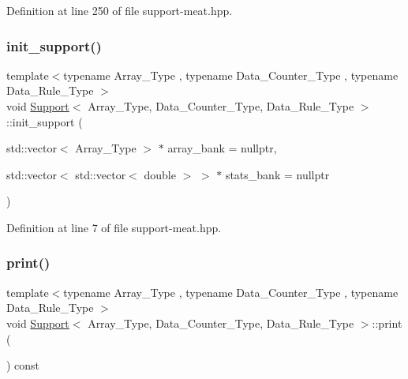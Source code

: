 Definition at line 250 of file support-\/meat.\+hpp.

\mbox{\label{class_support_a013872a55ffd6a0a931e124da8e8dc99}} 
\subsubsection{\texorpdfstring{init\+\_\+support()}{init\_support()}}
{\footnotesize\ttfamily template$<$typename Array\+\_\+\+Type , typename Data\+\_\+\+Counter\+\_\+\+Type , typename Data\+\_\+\+Rule\+\_\+\+Type $>$ \\
void \hyperlink{class_support}{Support}$<$ Array\+\_\+\+Type, Data\+\_\+\+Counter\+\_\+\+Type, Data\+\_\+\+Rule\+\_\+\+Type $>$\+::init\+\_\+support (\begin{DoxyParamCaption}\item[{std\+::vector$<$ Array\+\_\+\+Type $>$ $\ast$}]{array\+\_\+bank = {\ttfamily nullptr},  }\item[{std\+::vector$<$ std\+::vector$<$ double $>$ $>$ $\ast$}]{stats\+\_\+bank = {\ttfamily nullptr} }\end{DoxyParamCaption})\hspace{0.3cm}{\ttfamily [inline]}}



Definition at line 7 of file support-\/meat.\+hpp.

\mbox{\label{class_support_af87b2e85ec72e394387946023508e7fd}} 
\subsubsection{\texorpdfstring{print()}{print()}}
{\footnotesize\ttfamily template$<$typename Array\+\_\+\+Type , typename Data\+\_\+\+Counter\+\_\+\+Type , typename Data\+\_\+\+Rule\+\_\+\+Type $>$ \\
void \hyperlink{class_support}{Support}$<$ Array\+\_\+\+Type, Data\+\_\+\+Counter\+\_\+\+Type, Data\+\_\+\+Rule\+\_\+\+Type $>$\+::print (\begin{DoxyParamCaption}{ }\end{DoxyParamCaption}) const\hspace{0.3cm}{\ttfamily [inline]}}



